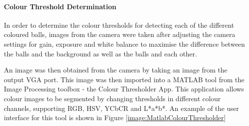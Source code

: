 \documentclass[a4paper]{article}
\begin{document}
\paragraph*{Colour Threshold Determination}

In order to determine the colour thresholds for detecting each of the different 
coloured balls, images from the camera were taken after adjusting the camera settings
for gain, exposure and white balance to maximise the difference between the balls 
and the background as well as the balls and each other.  

An image was then obtained from the camera by taking an image from the output VGA 
port. This image was then imported into a MATLAB tool from the Image Processing toolbox - 
the Colour Thresholder App. This application allows colour images to be segmented by changing
thresholds in different colour channels, supporting RGB, HSV, YCbCR and L*a*b*. An example of 
the user interface for this tool is shown in Figure \ref{image:MatlabColourThresholder}
\end{document}
